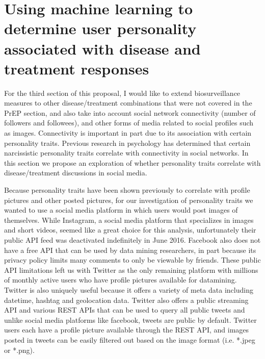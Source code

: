 \section{Using machine learning to determine user personality associated with disease and treatment responses}

For the third section of this proposal, I would like to extend biosurveillance measures to other disease/treatment combinations that were not covered in the PrEP section, and also take into account social network connectivity (number of followers and followees), and other forms of media related to social profiles such as images. Connectivity is important in part due to its association with certain personality traits. Previous research in psychology has determined that certain narcissistic personality traits correlate with connectivity in social networks\cite{buffardi2008narcissism}. In this section we propose an exploration of whether personality traits correlate with disease/treatment discussions in social media.

Because personality traits have been shown previously to correlate with profile pictures and other posted pictures\cite{ong2011narcissism}, for our investigation of personality traits we wanted to use a social media platform in which users would post images of themselves. While Instagram, a social media platform that specializes in images and short videos, seemed like a great choice for this analysis, unfortunately their public API feed was deactivated indefinitely in June 2016. Facebook also does not have a free API that can be used by data mining researchers, in part because its privacy policy limits many comments to only be viewable by friends. These public API limitations left us with Twitter as the only remaining platform with millions of monthly active users who have profile pictures available for datamining. Twitter is also uniquely useful because it offers a variety of meta data including datetime, hashtag and geolocation data. Twitter also offers a public streaming API and various REST APIs that can be used to query all public tweets and unlike social media platforms like facebook, tweets are public by default. Twitter users each have a profile picture available through the REST API, and images posted in tweets can be easily filtered out based on the image format (i.e. *.jpeg or *.png).

